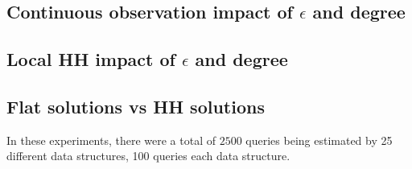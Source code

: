 \documentclass[11pt]{article}
\theoremstyle{definition}
\begin{document}
\subsection{Continuous observation impact of $\epsilon$ and degree}

\subsection{Local HH impact of $\epsilon$ and degree}

\subsection{Flat solutions vs HH solutions}
In these experiments, there were a total of $2500$ queries being estimated by 25 different data structures, 100 queries each data structure. 
\end{document}
